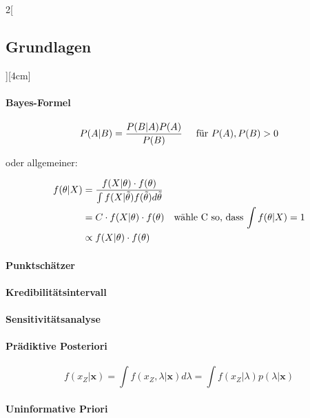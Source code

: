 \documentclass[8pt]{extarticle}
\begin{document}
\begin{multicols}{2}[\subsection{Grundlagen}][4cm] 

\paragraph{Bayes-Formel}
$$P(A|B)=\frac{P(B|A)P(A)}{P(B)} \hspace{0.5cm} \text{für } P(A), P(B) > 0$$

\begin{center}oder allgemeiner:\end{center}

\vspace{-1 em}

\begin{align*}
  f(\theta | X) &= \frac{f(X | \theta ) \cdot f(\theta)}{\int f(X|\tilde{\theta}) f(\tilde{\theta})  d \tilde{\theta}}\\
  &= C \cdot f(X | \theta ) \cdot f(\theta) \hspace{1 em} \text{wähle C so, dass $\int f(\theta | X)=1$} \\
  &\propto f(X | \theta ) \cdot f(\theta)
\end{align*}

\paragraph{Punktschätzer}

\paragraph{Kredibilitätsintervall}

\paragraph{Sensitivitätsanalyse}

\paragraph{Prädiktive Posteriori}

$$f(x_Z|\mathbf{x}) =\int f(x_Z, \lambda|\mathbf{x})d\lambda = \int f(x_Z|\lambda)p(\lambda|\mathbf{x})$$

\paragraph{Uninformative Priori} ~\\


\end{multicols}
\end{document}
